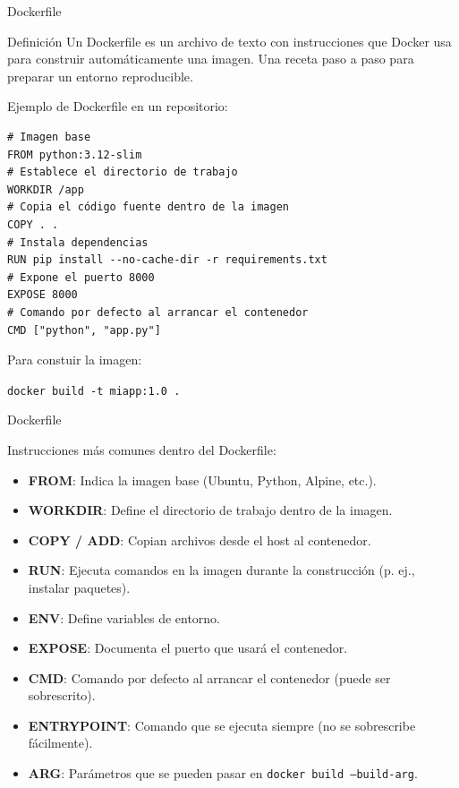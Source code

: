 \documentclass{beamer}
\begin{document}
\begin{frame}[fragile]{Dockerfile}

\begin{block}{Definición}
Un Dockerfile es un archivo de texto con instrucciones que Docker usa para construir automáticamente una imagen. Una receta paso a paso para preparar un entorno reproducible.
\end{block}

Ejemplo de Dockerfile en un repositorio:
\begin{verbatim}
# Imagen base
FROM python:3.12-slim
# Establece el directorio de trabajo
WORKDIR /app
# Copia el código fuente dentro de la imagen
COPY . .
# Instala dependencias
RUN pip install --no-cache-dir -r requirements.txt
# Expone el puerto 8000
EXPOSE 8000
# Comando por defecto al arrancar el contenedor
CMD ["python", "app.py"]
\end{verbatim}

Para constuir la imagen: 

\begin{center}
    \texttt{docker build -t miapp:1.0 .}
\end{center}

    
\end{frame}

\begin{frame}{Dockerfile}

Instrucciones más comunes dentro del Dockerfile:

\begin{itemize}
  \item \textbf{FROM}: Indica la imagen base (Ubuntu, Python, Alpine, etc.).
  \item \textbf{WORKDIR}: Define el directorio de trabajo dentro de la imagen.
  \item \textbf{COPY / ADD}: Copian archivos desde el host al contenedor.
  \item \textbf{RUN}: Ejecuta comandos en la imagen durante la construcción (p. ej., instalar paquetes).
  \item \textbf{ENV}: Define variables de entorno.
  \item \textbf{EXPOSE}: Documenta el puerto que usará el contenedor.
  \item \textbf{CMD}: Comando por defecto al arrancar el contenedor (puede ser sobrescrito).
  \item \textbf{ENTRYPOINT}: Comando que se ejecuta siempre (no se sobrescribe fácilmente).
  \item \textbf{ARG}: Parámetros que se pueden pasar en \texttt{docker build --build-arg}.
\end{itemize}

    
\end{frame}
\end{document}
